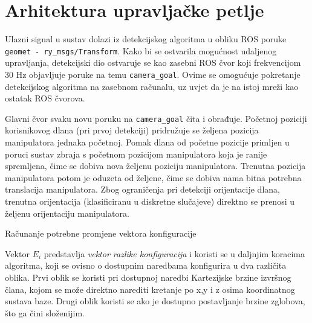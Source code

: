 \documentclass[times, utf8, diplomski, numeric]{fer}
\begin{document}
\section{Arhitektura upravljačke petlje}\label{arhitektura}
Ulazni signal u sustav dolazi iz detekcijskog algoritma u obliku ROS poruke \texttt{geomet - ry\_msgs/Transform}.
Kako bi se ostvarila mogućnost udaljenog upravljanja, detekcijski dio ostvaruje se kao zasebni ROS čvor koji frekvencijom 30 Hz objavljuje poruke na temu \texttt{camera\_goal}.
Ovime se omogućuje pokretanje detekcijskog algoritma na zasebnom računalu, uz uvjet da je na istoj mreži kao ostatak ROS čvorova.

Glavni čvor svaku novu poruku na \texttt{camera\_goal} čita i obrađuje.
Početnoj poziciji korisnikovog dlana (pri prvoj detekciji) pridružuje se željena pozicija manipulatora jednaka početnoj.
Pomak dlana od početne pozicije primljen u poruci sustav zbraja s početnom pozicijom manipulatora koja je ranije spremljena, čime se dobiva nova željenu poziciju manipulatora.
Trenutna pozicija manipulatora potom je oduzeta od željene, čime se dobiva nama bitna potrebna translacija manipulatora.
Zbog ograničenja pri detekciji orijentacije dlana, trenutna orijentacija (klasificiranu u diskretne slučajeve) direktno se prenosi u željenu orijentaciju manipulatora.

\begin{algorithm}[H]
\caption{Računanje potrebne promjene vektora konfiguracije}
\begin{algorithmic}
\ENDIF
{}
\ENDIF
{}
\ENDFOR
\end{algorithmic}
\end{algorithm}

Vektor $E_i$ predstavlja \textit{vektor razlike konfiguracija} i koristi se u daljnjim koracima algoritma, koji se ovisno o dostupnim naredbama konfigurira u dva različita oblika.
Prvi oblik se koristi pri dostupnoj naredbi Kartezijske brzine izvršnog člana, kojom se može direktno narediti kretanje po x,y i z osima koordinatnog sustava baze.
Drugi oblik koristi se ako je dostupno postavljanje brzine zglobova, što ga čini složenijim.
\end{document}
